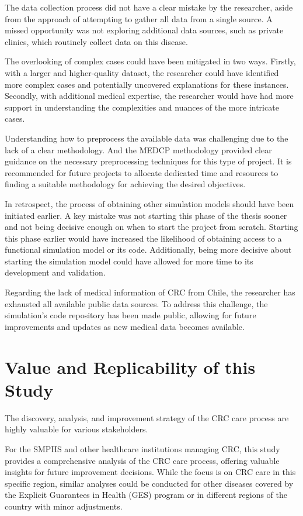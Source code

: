 The data collection process did not have a clear mistake by the researcher, aside from the approach of attempting to gather all data from a single source. A missed opportunity was not exploring additional data sources, such as private clinics, which routinely collect data on this disease.

The overlooking of complex cases could have been mitigated in two ways. Firstly, with a larger and higher-quality dataset, the researcher could have identified more complex cases and potentially uncovered explanations for these instances. Secondly, with additional medical expertise, the researcher would have had more support in understanding the complexities and nuances of the more intricate cases.

Understanding how to preprocess the available data was challenging due to the lack of a clear methodology. And the MEDCP methodology provided clear guidance on the necessary preprocessing techniques for this type of project. It is recommended for future projects to allocate dedicated time and resources to finding a suitable methodology for achieving the desired objectives.

In retrospect, the process of obtaining other simulation models should have been initiated earlier. A key mistake was not starting this phase of the thesis sooner and not being decisive enough on when to start the project from scratch. Starting this phase earlier would have increased the likelihood of obtaining access to a functional simulation model or its code. Additionally, being more decisive about starting the simulation model could have allowed for more time to its development and validation.

Regarding the lack of medical information of CRC from Chile, the researcher has exhausted all available public data sources. To address this challenge, the simulation's code repository has been made public, allowing for future improvements and updates as new medical data becomes available.

\section{Value and Replicability of this Study}

The discovery, analysis, and improvement strategy of the CRC care process are highly valuable for various stakeholders.

For the SMPHS and other healthcare institutions managing CRC, this study provides a comprehensive analysis of the CRC care process, offering valuable insights for future improvement decisions. While the focus is on CRC care in this specific region, similar analyses could be conducted for other diseases covered by the Explicit Guarantees in Health (GES) program or in different regions of the country with minor adjustments.

